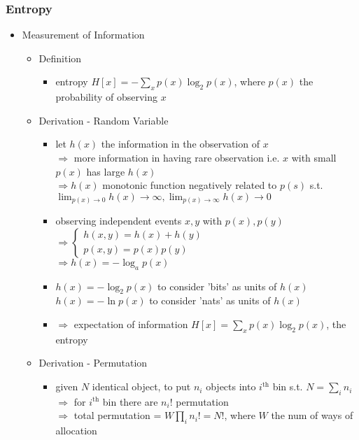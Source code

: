 \subsubsection{Entropy}
\begin{itemize}
\item Measurement of Information
	\begin{itemize}
	\item Definition
		\begin{itemize}
		\item entropy $\displaystyle H[x]=-\sum_xp(x)\log_2p(x)$, where $p(x)$ the probability of observing $x$
		\end{itemize}
	\item Derivation - Random Variable
		\begin{itemize}
		\item let $h(x)$ the information in the observation of $x$ \\
		$\Rightarrow$ more information in having rare observation i.e. $x$ with small $p(x)$ has large $h(x)$ \\
		$\Rightarrow h(x)$ monotonic function negatively related to $p(s)$ s.t. $\lim_{p(x)\rightarrow0}h(x)\rightarrow\infty, \lim_{p(x)\rightarrow\infty}h(x)\rightarrow0$
		\item observing independent events $x,y$ with $p(x), p(y)$ \\
		$\Rightarrow \begin{cases} h(x, y) = h(x) + h(y) \\ p(x,y) = p(x)p(y)\end{cases}$ \\
		$\Rightarrow h(x) = -\log_a p(x)$
		\item $h(x)=-\log_2p(x)$ to consider 'bits' as units of $h(x)$ \\
		$h(x)=-\ln p(x)$ to consider 'nats' as units of $h(x)$
		\item $\Rightarrow$ expectation of information $H[x] = \sum_x p(x)\log_2p(x)$, the entropy
		\end{itemize}
	\item Derivation - Permutation
		\begin{itemize}
		\item given $N$ identical object, to put $n_i$ objects into $i^\text{th}$ bin s.t. $N=\sum_{i} n_i$ \\
		$\Rightarrow$ for $i^\text{th}$ bin there are $n_i!$ permutation \\
		$\Rightarrow$ total permutation = $W\prod_i n_i!=N!$, where $W$ the num of ways of allocation \\

\end{itemize}
\end{itemize}
\end{itemize}
